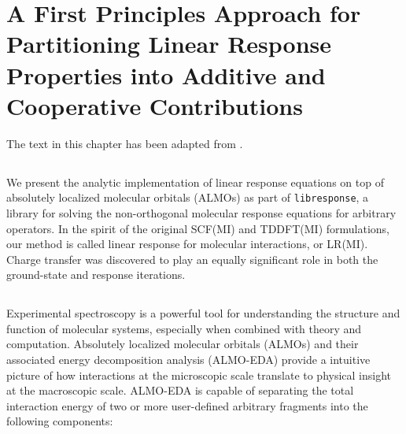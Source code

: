 \chapter[Linear Response with Absolutely Localized Molecular Orbitals]{A First Principles Approach for Partitioning Linear Response Properties into Additive and Cooperative Contributions}
\label{ch:paper_04}

The text in this chapter has been adapted from .

\newcommand{\arlidimer}{\ce{Ar\bond{....}Li+}}

\newcommand{\aud}{\si{\bohr\cubed}}
\newcommand{\geomdeftsvp}{\SI{2.4106}{\angstrom}}
\newcommand{\geomdeftsvpd}{\SI{2.4297}{\angstrom}}

\newcommand{\pdalton}{\textsc{Dalton}}
\newcommand{\libresponse}{\texttt{libresponse}}
\newcommand{\psif}{\textsc{Psi4}}
\newcommand{\qchem}{\textsc{Q-Chem}}
\newcommand{\response}{\textsc{Response}}
\newcommand{\op}[1]{\ensuremath{\hat{#1}}}
\newcommand{\mat}[1]{\ensuremath{\mathbf{#1}}}
\newcommand{\Order}[1]{\ensuremath{\mathcal{O}\left(#1\right)}}
\newcommand{\tr}[1]{\ensuremath{{\mathrm{Tr}}\left\{#1\right\}}}
\newcommand{\eq}[1]{eq.~(\ref{#1})}
\let\citenum\cite
\newcommand{\citen}[1]{ref.~\citenum{#1}}
\newcommand{\lr}[2]{\braket{\braket{\op{#1}; \op{#2}}}}
\newcommand{\lrs}[4]{\braket{\braket{\op{#1}_{#2}; \op{#3}_{#4}}}}

\section{\texorpdfstring{}{Summary}}

We present the analytic implementation of linear response equations on top of absolutely localized molecular orbitals (ALMOs) as part of \libresponse{}, a library for solving the non-orthogonal molecular response equations for arbitrary operators. In the spirit of the original SCF(MI) and TDDFT(MI) formulations, our method is called linear response for molecular interactions, or LR(MI). Charge transfer was discovered to play an equally significant role in both the ground-state and response iterations.

\section{\texorpdfstring{}{Introduction}}
\label{sec:introduction}

Experimental spectroscopy is a powerful tool for understanding the structure and function of molecular systems, especially when combined with theory and computation\cite{AUTSCHBACH200383,NEESE2009526,doi:10.1021/cr2002239}. Absolutely localized molecular orbitals (ALMOs)\cite{Khaliullin2006} and their associated energy decomposition analysis (ALMO-EDA)\cite{Khaliullin2007} provide a intuitive picture of how interactions at the microscopic scale translate to physical insight at the macroscopic scale. ALMO-EDA is capable of separating the total interaction energy of two or more user-defined arbitrary fragments into the following components:

